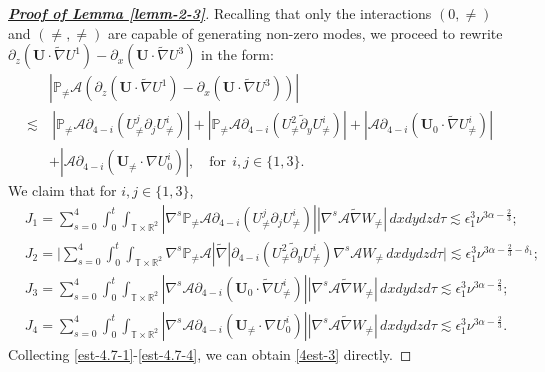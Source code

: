 \documentclass[11pt,reqno]{article}
\numberwithin{equation}{section}
\newcommand\R{{\mathbb R}}
\newcommand\T{{\mathbb T}}
\newcommand\PP{{\mathbb P}}
\newcommand\A{\mathcal{A}}
\newcommand\U{\bm{U}}
\let\pa=\partial
\let\na=\nabla
\let\al=\alpha
\let\f=\frac
\let\ep=\epsilon
\begin{document}
\begin{proof}[\underline{\textbf{Proof of Lemma \ref{lemm-2-3}}}]
Recalling that only the interactions $(0,\not=)$ and $(\not=,\not=)$ are capable of generating non-zero modes, we proceed to rewrite
$\pa_{z}(\U\cdot\widetilde{\nabla}U^1)-\pa_{x}(\U\cdot\widetilde{\nabla}U^3)$ in the form:
\begin{align*}
	&|\PP_{\not=}\A(\pa_{z}(\U\cdot\widetilde{\nabla}U^1)-\pa_{x}(\U\cdot\widetilde{\nabla}U^3))|
	\\
	\lesssim &~
	|\PP_{\not=}\A\pa_{4-i}(U^j_{\not=}\pa_{j}U^i_{\not=})|
	+|\PP_{\not=}\A\pa_{4-i}(U^2_{\not=}\tilde{\pa}_{y}U^i_{\not=})|
	+|\A\pa_{4-i}(\U_{0}\cdot\widetilde{\na}U^{i}_{\not=})|
	\\
	&
    +|\A\pa_{4-i}(\U_{\not=}\cdot\nabla U^{i}_{0})|,
	\quad\text{for}~~i,j\in\{1,3\}.
\end{align*}
We claim that for $i,j\in\{1,3\}$,
\begin{align}
	&J_1=\sum_{s=0}^{4}
	\int_0^t\int_{\T\times\R^2}
	|\nabla^s\PP_{\not=}\A\pa_{4-i}(U^j_{\not=}\pa_{j}U^i_{\not=})|
	|\nabla^s\A\widetilde{\nabla}W_{\not=}|\,dxdydzd\tau
	\lesssim \ep_1^3\nu^{3\al-\f23};
	\label{est-4.7-1}
	\\
	&J_2=\Big| \sum_{s=0}^{4}
	\int_0^t\int_{\T\times\R^2}
	\nabla^s\PP_{\not=}\A|\widetilde{\nabla}|\pa_{4-i}(U^2_{\not=}\tilde{\pa}_{y}U^i_{\not=})
	\nabla^s\A W_{\not=} \,dxdydzd\tau \Big|
	\lesssim \ep_1^3\nu^{3\al-\f23-\delta_1};
	\label{est-4.7-2}
	\\
	&J_3=\sum_{s=0}^{4}
	\int_0^t\int_{\T\times\R^2}
	|\nabla^s \A\pa_{4-i}(\U_{0}\cdot\widetilde{\na}U^{i}_{\not=})|
|\nabla^s\A\widetilde{\nabla}W_{\not=}|\,dxdydzd\tau
	\lesssim \ep_1^3\nu^{3\al-\f23};
	\label{est-4.7-3}
	\\
	&J_4=\sum_{s=0}^{4}
	\int_0^t\int_{\T\times\R^2}
	|\nabla^s\A\pa_{4-i}(\U_{\not=}\cdot\nabla U^{i}_{0})|
	|\nabla^s\A\widetilde{\nabla}W_{\not=}|\,dxdydzd\tau
	\lesssim \ep_1^3\nu^{3\al-\f23}.
	\label{est-4.7-4}
\end{align}
Collecting \eqref{est-4.7-1}-\eqref{est-4.7-4}, we can obtain \eqref{4est-3} directly.


\end{proof}
\end{document}
